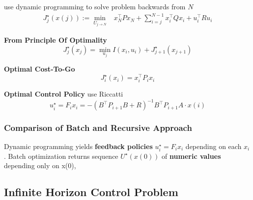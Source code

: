 use dynamic programming to solve problem backwards from $N$
%
\begin{align*}
  J_j^\star(x(j)) :=
  \min_{U_{j\to N}} & x_N^\top P x_N \!+
  \sum_{i=j}^{N-1}x_i^\top Q x_i + u_i^\top R u_i
\end{align*}
%
\begin{minipage}[t]{0.64\linewidth}
  \textbf{From Principle Of Optimality}
  \[
    J_j^\star(x_j) =
    \min_{u_j} I(x_i,u_i) + J_{j+1}^\star(x_{j+1})
  \]
\end{minipage}
\begin{minipage}[t]{0.32\linewidth}
  \textbf{Optimal Cost-To-Go}
  \[
    J_i^\star(x_i) = x_i^\top P_i x_i
  \]
\end{minipage}
%
\textbf{Optimal Control Policy}
use Riccatti
\[
  u_i^\star = F_i x_i =
  -(B^\top P_{i+1}B + R)^{-1}
  B^\top P_{i+1} A \cdot x(i)
\]

\subsubsection{Comparison of Batch and Recursive Approach}

Dynamic programming yields \textbf{feedback policies}
$u_i^\star = F_i x_i$ depending on each $x_i$.
Batch optimization returns sequence $U^\star(x(0))$
of \textbf{numeric values} depending only on x(0),

\subsection{Infinite Horizon Control Problem}


